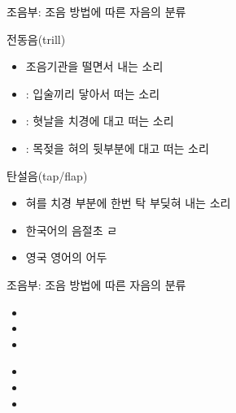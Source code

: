 \documentclass[11pt, aspectratio=169]{beamer}
\newcommand{\textds}[1]{{\ipafont #1}}
\begin{document}
\begin{frame}[t]{조음부: 조음 방법에 따른 자음의 분류}
    \begin{block}{전동음(trill)}
        \begin{itemize}
            \item 조음기관을 떨면서 내는 소리
            \item \textds{[ʙ]}: 입술끼리 닿아서 떠는 소리
            \item \textds{[r]}: 혓날을 치경에 대고 떠는 소리
            \item \textds{[ʀ]}: 목젖을 혀의 뒷부분에 대고 떠는 소리
        \end{itemize}
    \end{block}
    \begin{block}{탄설음(tap/flap)}
        \begin{itemize}
            \item 혀를 치경 부분에 한번 탁 부딪혀 내는 소리
            \item 한국어의 음절초 ㄹ \textds{[ɾ]}
            \item 영국 영어의 어두 \textds{[ɾ]}
        \end{itemize}
    \end{block}

\end{frame}

\begin{frame}[t]{조음부: 조음 방법에 따른 자음의 분류}
    \begin{block}{}
        \begin{itemize}
            \item 
            \item 
            \item 
        \end{itemize}
    \end{block}
    \begin{block}{}
        \begin{itemize}
            \item 
            \item 
            \item 
        \end{itemize}
    \end{block}

\end{frame}
\end{document}
